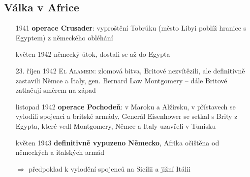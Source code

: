 \documentclass{article}
\begin{document}
\subsection*{Válka v Africe}
\begin{itemize}
    \item[1941] \textbf{operace Crusader}: vyproštění Tobrúku (město Libyi poblíž hranice s Egyptem) z německého obléhání
    \item[květen 1942] německý útok, dostali se až do Egypta
    \item[23. říjen 1942] \textsc{El Alamein}: zlomová bitva, Britové nezvítězili, ale definitivně zastavili Němce a Italy, gen. Bernard Law Montgomery -- dále Britové zatlačují směrem na západ
    \item[listopad 1942] \textbf{operace Pochodeň}: v Maroku a Alžírsku, v přístavech se vylodili spojenci a britské armády, Generál Eisenhower se setkal s Brity z Egypta, které vedl Montgomery, Němce a Italy uzavřeli v Tunisku
    \item[květen 1943] \textbf{definitivně vypuzeno Německo}, Afrika očištěna od německých a italských armád
    \item[$\Rightarrow$] předpoklad k vylodění spojenců na Sicílii a jižní Itálii
\end{itemize}
\end{document}
